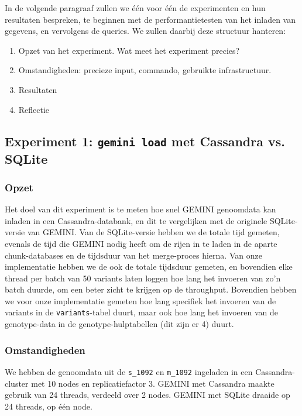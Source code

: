 In de volgende paragraaf zullen we \'e\'en voor \'e\'en de experimenten en hun resultaten bespreken, te beginnen met de performantietesten van het inladen van gegevens, en vervolgens de queries. We zullen daarbij deze structuur hanteren:
\begin{enumerate}
\item Opzet van het experiment. Wat meet het experiment precies?
\item Omstandigheden: precieze input, commando, gebruikte infrastructuur.
\item Resultaten
\item Reflectie
\end{enumerate}

\subsection{Experiment 1: \texttt{gemini load} met Cassandra vs. SQLite}
\label{exp1}

\subsubsection{Opzet}

Het doel van dit experiment is te meten hoe snel GEMINI genoomdata kan inladen in een Cassandra-databank, en dit te vergelijken met de originele SQLite-versie van GEMINI. Van de SQLite-versie hebben we de totale tijd gemeten, evenals de tijd die GEMINI nodig heeft om de rijen in te laden in de aparte chunk-databases en de tijdsduur van het merge-proces hierna. Van onze implementatie hebben we de ook de totale tijdsduur gemeten, en bovendien elke thread per batch van 50 variants laten loggen hoe lang het invoeren van zo'n batch duurde, om een beter zicht te krijgen op de throughput. Bovendien hebben we voor onze implementatie gemeten hoe lang specifiek het invoeren van de variants in de \texttt{variants}-tabel duurt, maar ook hoe lang het invoeren van de genotype-data in de genotype-hulptabellen (dit zijn er 4) duurt. 

\subsubsection{Omstandigheden}
We hebben de genoomdata uit de \texttt{s\_1092} en \texttt{m\_1092} ingeladen in een Cassandra-cluster met 10 nodes en replicatiefactor 3. GEMINI met Cassandra maakte gebruik van 24 threads, verdeeld over 2 nodes. GEMINI met SQLite draaide op 24 threads, op \'e\'en node.

